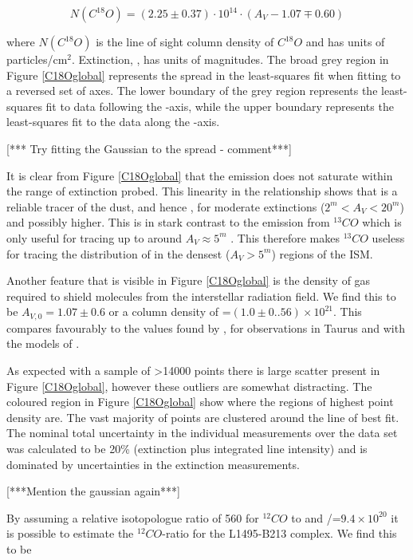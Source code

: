 \documentclass{aa}
\begin{document}
\begin{equation}
N(C^{18}O)=(2.25 \pm 0.37) \cdot 10^{14} \cdot (A_V - 1.07 \mp 0.60)
\end{equation}

where $N(C^{18}O)$ is the line of sight column density of $C^{18}O$ and has units of particles/cm$^2$. Extinction, \av, has units of magnitudes. The broad grey region in Figure \ref{C18Oglobal} represents the spread in the least-squares fit when fitting to a reversed set of axes. The lower boundary of the grey region represents the least-squares fit to data following the \av-axis, while the upper boundary represents the least-squares fit to the data along the \neco-axis.

[*** Try fitting the Gaussian to the spread - comment***]

It is clear from Figure \ref{C18Oglobal} that the \eco emission does not saturate within the range of extinction probed. This linearity in the relationship shows that \neco is a reliable tracer of the dust, and hence \htwo, for moderate extinctions ($2^m<A_V<20^m$) and possibly higher. This is in stark contrast to the emission from $^{13}CO$ which is only useful for tracing \htwo up to around $A_V \approx 5^m$ \citep{pineda08}. This therefore makes $^{13}CO$ useless for tracing the distribution of \htwo in the densest ($A_V>5^m$) regions of the ISM.

Another feature that is visible in Figure \ref{C18Oglobal} is the density of gas required to shield \eco molecules from the interstellar radiation field. We find this to be $A_{V,0}=1.07 \pm 0.6$ or a \htwo column density of \nhtwo=$(1.0 \pm 0..56) \times 10^21$. This compares favourably to the values found by \citet{frerking82}, \citet{duvert86} for observations in Taurus and with the models of \citet{vanDishoeck88}.

As expected with a sample of >14000 points there is large scatter present in Figure \ref{C18Oglobal}, however these outliers are somewhat distracting. The coloured region in Figure \ref{C18Oglobal} show where the regions of highest point density are. The vast majority of points are clustered around the line of best fit. The nominal total uncertainty in the individual measurements over the data set was calculated to be 20\% (extinction plus integrated line intensity) and is dominated by uncertainties in the extinction measurements.

[***Mention the gaussian again***]

By assuming a relative isotopologue ratio of 560 for $^{12}CO$ to \eco \citep{wilson94} and \nhtwo/\av=$9.4\times 10^{20}$ \citep{bohlin78} it is possible to estimate the $^{12}CO$-\htwo ratio for the L1495-B213 complex. We find this to be 
\end{document}
